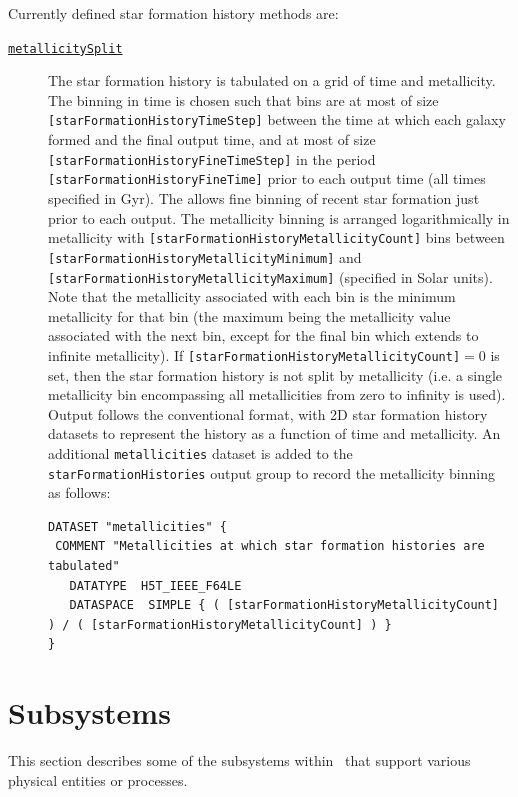 Currently defined star formation history methods are:
\begin{description}
 \item [\hyperlink{galacticus.output.merger_tree.star_formation.metallicity_split.F90:star_formation_histories_metallicity_split}{{\tt metallicitySplit}}] The star formation history is tabulated on a grid of time and metallicity. The binning in time is chosen such that bins are at most of size {\tt [starFormationHistoryTimeStep]} between the time at which each galaxy formed and the final output time, and at most of size {\tt [starFormationHistoryFineTimeStep]} in the period {\tt [starFormationHistoryFineTime]} prior to each output time (all times specified in Gyr). The allows fine binning of recent star formation just prior to each output. The metallicity binning is arranged logarithmically in metallicity with {\tt [starFormationHistoryMetallicityCount]} bins between {\tt [starFormationHistoryMetallicityMinimum]} and {\tt [starFormationHistoryMetallicityMaximum]} (specified in Solar units). Note that the metallicity associated with each bin is the minimum metallicity for that bin (the maximum being the 
metallicity value associated with the next bin, except for the final bin which extends to infinite metallicity). If {\tt [starFormationHistoryMetallicityCount]}$=0$ is set, then the star formation history is not split by metallicity (i.e. a single metallicity bin encompassing all metallicities from zero to infinity is used).  Output follows the conventional format, with 2D star formation history datasets to represent the history as a function of time and metallicity. An additional {\tt metallicities} dataset is added to the {\tt starFormationHistories} output group to record the metallicity binning as follows:
\begin{verbatim}
DATASET "metallicities" {
 COMMENT "Metallicities at which star formation histories are tabulated"
   DATATYPE  H5T_IEEE_F64LE
   DATASPACE  SIMPLE { ( [starFormationHistoryMetallicityCount] ) / ( [starFormationHistoryMetallicityCount] ) }
}
\end{verbatim}
\end{description}

\section{Subsystems}

This section describes some of the subsystems within \glc\ that support various physical entities or processes.

